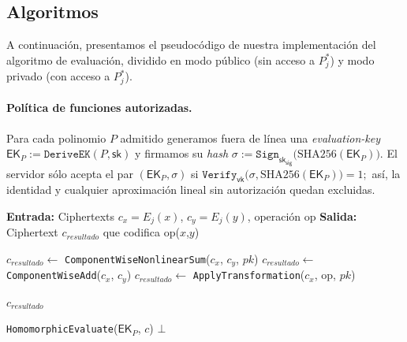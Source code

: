 \documentclass[11pt]{article}
\theoremstyle{plain}
\begin{document}
\subsection{Algoritmos}

A continuación, presentamos el pseudocódigo de nuestra implementación del algoritmo de evaluación, dividido en modo público (sin acceso a $P^*_j$) y modo privado (con acceso a $P^*_j$).

\paragraph{Política de funciones autorizadas.} Para cada polinomio $P$ admitido generamos fuera de línea una \emph{evaluation-key} \( \mathsf{EK}_P := \texttt{DeriveEK}(P,\mathsf{sk}) \) y firmamos su \emph{hash} \( \sigma := \texttt{Sign}_{\mathsf{sk_{sig}}}\bigl(\mathrm{SHA256}(\mathsf{EK}_P)\bigr). \) El servidor sólo acepta el par $(\mathsf{EK}_P,\sigma)$ si \( \texttt{Verify}_{\mathsf{vk}}\bigl(\sigma,\mathrm{SHA256}(\mathsf{EK}_P)\bigr)=1; \) así, la identidad y cualquier aproximación lineal sin autorización quedan excluidas.

\begin{algorithm}
\caption{Evaluación en Modo Público (sin $P^*_j$)}
\begin{algorithmic}[1]
    \State \textbf{Entrada:} Ciphertexts $c_x = E_j(x)$, $c_y = E_j(y)$, operación op
    \State \textbf{Salida:} Ciphertext $c_{resultado}$ que codifica op($x$,$y$)
    
        \State $c_{resultado} \gets$ \texttt{ComponentWiseNonlinearSum}($c_x$, $c_y$, $pk$)
        \State $c_{resultado} \gets$ \texttt{ComponentWiseAdd}($c_x$, $c_y$)
        \State $c_{resultado} \gets$ \texttt{ApplyTransformation}($c_x$, op, $pk$)
    \EndIf
    
    \State \Return $c_{resultado}$
\EndProcedure
\end{algorithmic}
\end{algorithm}

\begin{algorithm}
\caption{Eval}
\begin{algorithmic}[1]
        \State \Return \texttt{HomomorphicEvaluate}($\mathsf{EK}_P$, $c$)
    \Else
        \State \Return $\bot$  
    \EndIf
\EndProcedure
\end{algorithmic}
\end{algorithm}
\end{document}
